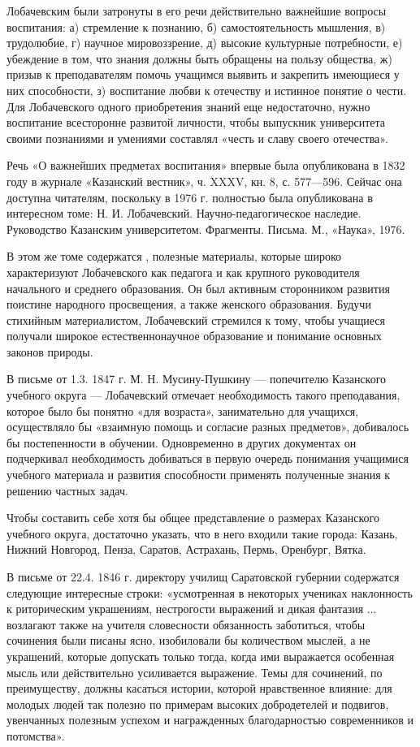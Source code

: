 \documentclass[12pt, a4paper, openany]{book}
\begin{document}
Лобачевским были затронуты в его речи действительно важнейшие вопросы воспитания: а) стремление к познанию, б) самостоятельность мышления, в) трудолюбие, г) научное мировоззрение, д) высокие культурные потребности, е)  убеждение в том, что знания должны быть обращены на пользу общества, ж) призыв к преподавателям помочь учащимся выявить и закрепить имеющиеся у них способности, з)  воспитание любви к отечеству и истинное понятие о чести. Для Лобачевского одного приобретения знаний еще  недостаточно, нужно воспитание всесторонне развитой личности, чтобы выпускник университета своими познаниями и  умениями составлял «честь и славу своего отечества». 

Речь «О важнейших предметах воспитания» впервые была опубликована в 1832 году в журнале «Казанский  вестник», ч. XXXV, кн. 8, с. 577—596. Сейчас она доступна читателям, поскольку в 1976 г. полностью была  опубликована в интересном томе: Н. И. Лобачевский.  Научно-педагогическое наследие. Руководство Казанским  университетом. Фрагменты. Письма. М., «Наука», 1976. 

В этом же томе содержатся , полезные материалы,  которые широко характеризуют Лобачевского как педагога и как крупного руководителя начального и среднего  образования. Он был активным сторонником развития поистине народного просвещения, а также женского образования. Будучи стихийным материалистом, Лобачевский стремился к тому, чтобы учащиеся получали широкое естественнонаучное образование и понимание основных законов  природы. 

В письме от 1.3. 1847 г. М. Н. Мусину-Пушкину —  попечителю Казанского учебного округа — Лобачевский  отмечает необходимость такого преподавания, которое  было бы понятно «для возраста», занимательно для учащихся, осуществляло бы «взаимную помощь и согласие разных  предметов», добивалось бы постепенности в обучении.  Одновременно в других документах он подчеркивал необходимость добиваться в первую очередь понимания учащимися  учебного материала и развития способности применять  полученные знания к решению частных задач. 

Чтобы составить себе хотя бы общее представление о размерах Казанского учебного округа, достаточно указать, что в него входили такие города: Казань, Нижний  Новгород, Пенза, Саратов, Астрахань, Пермь, Оренбург, Вятка. 

В письме от 22.4. 1846 г. директору училищ Саратовской губернии содержатся следующие интересные строки:  «усмотренная в некоторых учениках наклонность к  риторическим украшениям, нестрогости выражений и дикая  фантазия ... возлагают также на учителя словесности  обязанность заботиться, чтобы сочинения были писаны ясно,  изобиловали бы количеством мыслей, а не украшений, которые допускать только тогда, когда ими выражается особенная мысль или действительно усиливается выражение. Темы для сочинений, по преимуществу, должны касаться  истории, которой нравственное влияние: для молодых людей так полезно по примерам высоких добродетелей и  подвигов, увенчанных полезным успехом и награжденных  благодарностью современников и потомства». 
\end{document}
